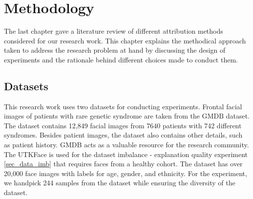 \documentclass[../report.tex]{subfiles}
\begin{document}
    \chapter{Methodology}\label{ch_method}
    \noindent
	The last chapter gave a literature review of different attribution methods considered for our research work. This chapter explains the methodical approach taken to address the research problem at hand by discussing the design of experiments and the rationale behind different choices made to conduct them. 
	\section{Datasets}
	\noindent
	This research work uses two datasets for conducting experiments. Frontal facial images of patients with rare genetic syndrome are taken from the GMDB dataset. The dataset contains 12,849 facial images from 7640 patients with 742 different syndromes. Besides patient images, the dataset also contains other details, such as patient history. GMDB acts as a valuable resource for the research community.\\
	The UTKFace \cite{zhifei2017cvpr} is used for the dataset imbalance - explanation quality experiment   \ref{sec_data_imb} that requires faces from a healthy cohort. The dataset has over 20,000 face images with labels for age, gender, and ethnicity. For the experiment, we handpick 244 samples from the dataset while ensuring the diversity of the dataset.
\end{document}
